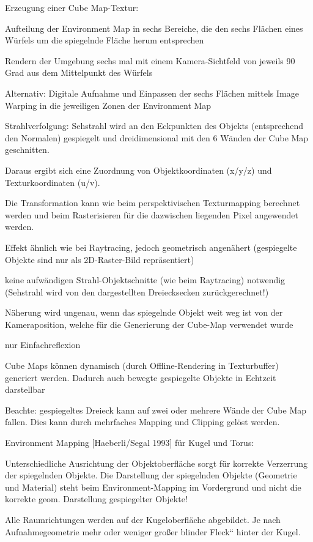 \documentclass[landscape]{article}
\begin{document}
\begin{multicols}{3}
  Erzeugung einer Cube Map-Textur:
  \begin{itemize*}
    \item Aufteilung der Environment Map in sechs Bereiche, die den sechs Flächen eines Würfels um die spiegelnde Fläche herum entsprechen
    \item Rendern der Umgebung sechs mal mit einem Kamera-Sichtfeld von jeweils 90 Grad aus dem Mittelpunkt des Würfels
    \item Alternativ: Digitale Aufnahme und Einpassen der sechs Flächen mittels Image Warping in die jeweiligen Zonen der Environment Map
    \item Strahlverfolgung: Sehstrahl wird an den Eckpunkten des Objekts (entsprechend den Normalen) gespiegelt und dreidimensional mit den 6 Wänden der Cube Map geschnitten.
    \item Daraus ergibt sich eine Zuordnung von Objektkoordinaten (x/y/z) und Texturkoordinaten (u/v).
    \item Die Transformation kann wie beim perspektivischen Texturmapping berechnet werden und beim Rasterisieren für die dazwischen liegenden Pixel angewendet werden.
    \item Effekt ähnlich wie bei Raytracing, jedoch geometrisch angenähert (gespiegelte Objekte sind nur als 2D-Raster-Bild repräsentiert)
    \item keine aufwändigen Strahl-Objektschnitte (wie beim Raytracing) notwendig (Sehstrahl wird von den dargestellten Dreiecksecken zurückgerechnet!)
    \item Näherung wird ungenau, wenn das spiegelnde Objekt weit weg ist von der Kameraposition, welche für die Generierung der Cube-Map verwendet wurde
    \item nur Einfachreflexion
    \item Cube Maps können dynamisch (durch Offline-Rendering in Texturbuffer) generiert werden. Dadurch auch bewegte gespiegelte Objekte in Echtzeit darstellbar
    \item Beachte: gespiegeltes Dreieck kann auf zwei oder mehrere Wände der Cube Map fallen. Dies kann durch mehrfaches Mapping und Clipping gelöst werden.
  \end{itemize*}
  
  Environment Mapping [Haeberli/Segal 1993] für Kugel und Torus: 
  \begin{itemize*}
    \item Unterschiedliche Ausrichtung der Objektoberfläche sorgt für korrekte Verzerrung der spiegelnden Objekte. Die Darstellung der spiegelnden Objekte (Geometrie und Material) steht beim Environment-Mapping im Vordergrund und nicht die korrekte geom. Darstellung gespiegelter Objekte!
    \item Alle Raumrichtungen werden auf der Kugeloberfläche abgebildet. Je nach Aufnahmegeometrie mehr oder weniger großer blinder Fleck“ hinter der Kugel.
  \end{itemize*}
  

\end{multicols}
\end{document}
